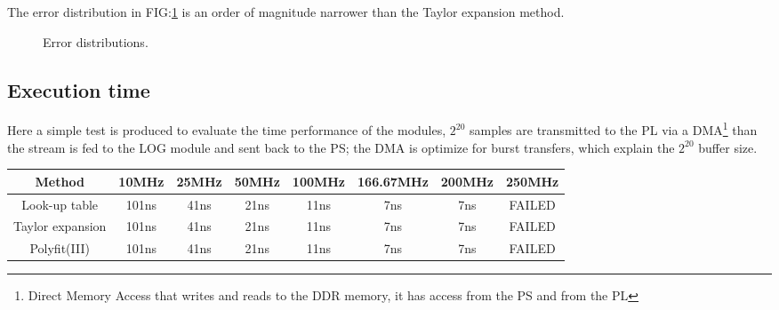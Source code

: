 \documentclass[12pt]{article}
\begin{document}
The error distribution in FIG:\ref{fig:POLY_Error} is an order of magnitude narrower than the Taylor expansion method.
\begin{figure}[h]
    \begin{minipage}[c]{0.5\linewidth}
        \vspace{0pt}
        \centering
    \end{minipage}%
    \hfill%
    \begin{minipage}[c]{0.5\linewidth}
        \vspace{0pt}
        \centering
    \end{minipage}%
    \caption{Error distributions.}
    \label{fig:POLY_Error}
\end{figure}

\subsection{Execution time}

Here a simple test is produced to evaluate the time performance of the modules, $2^{20}$ samples are transmitted to the PL via a DMA\footnote{Direct Memory Access that writes and reads to the DDR memory, it has access from the PS and from the PL} than the stream is fed to the LOG module and sent back to the PS; the DMA is optimize for burst transfers, which explain the $2^{20}$ buffer size.
\begin{table}[h]
\begin{tabular}{c||ccccccc} 
Method           & 10MHz  & 25MHz  & 50MHz & 100MHz & 166.67MHz & 200MHz & 250MHz\\ \hline
Look-up table    & 101ns & 41ns & 21ns & 11ns & 7ns & 7ns & FAILED\\
Taylor expansion & 101ns & 41ns & 21ns & 11ns & 7ns & 7ns & FAILED\\
Polyfit(III) & 101ns & 41ns & 21ns & 11ns & 7ns & 7ns & FAILED\\
\end{tabular}
\end{table}
\end{document}
